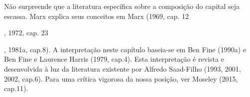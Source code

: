  \par 
Não surpreende que a literatura específica sobre a composição do capital seja escassa. Marx explica seus conceitos em Marx (1969, cap. {\color{blue} 12 } {\par} , 1972, cap. {\color{blue} 23 } {\par} , 1981a, cap.{\color{blue}8}). A interpretação neste capítulo baseia-se em Ben Fine (1990a) e Ben Fine e Laurence Harris (1979, cap.{\color{blue}4}). Esta interpretação é revista e desenvolvida à luz da literatura existente por Alfredo Saad-Filho (1993, 2001, 2002, cap.{\color{blue}6}). Para uma crítica vigorosa da nossa posição, ver Moseley (2015, cap.{\color{blue}11}).